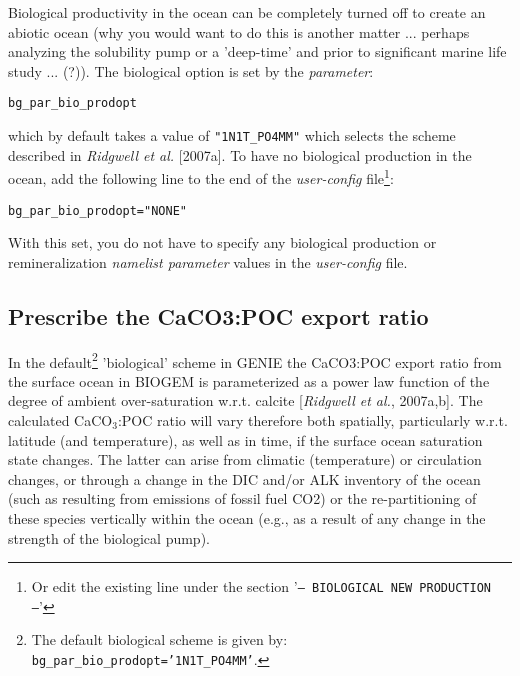 \documentclass[11pt,fleqn]{book} %
\begin{document}
Biological productivity in the ocean can be completely turned off to create an abiotic ocean (why you would want to do this is another matter ... perhaps analyzing the solubility pump or a 'deep-time' and prior to significant marine life study ... (?)). The biological option is set by the \textit{parameter}:
\vspace{-5mm}\small\begin{verbatim}
bg_par_bio_prodopt
\end{verbatim}\vspace{-1mm}\normalsize
 which by default takes a value of \texttt{"1N1T\_PO4MM"} which selects the scheme described in \textit{Ridgwell et al.} [2007a]. To have no biological production in the ocean, add the following line to the end of the \textit{user-config} file\footnote{Or edit the existing line under the section '\texttt{--- BIOLOGICAL NEW PRODUCTION ---}'}:
\vspace{-2mm}\small\begin{verbatim}
bg_par_bio_prodopt="NONE"
\end{verbatim}\normalsize\vspace{-2mm}
With this set, you do not have to specify any biological production or remineralization \textit{namelist parameter} values in the \textit{user-config} file.

%
\newpage
\subsection*{Prescribe the CaCO3:POC export ratio}
\vspace{1mm}

In the default\footnote{The default biological scheme is given by: \texttt{bg\_par\_bio\_prodopt='1N1T\_PO4MM'}.} 'biological' scheme in GENIE the CaCO3:POC export ratio from the surface ocean in BIOGEM is parameterized as a power law function of the degree of ambient over-saturation w.r.t. calcite [\textit{Ridgwell et al.}, 2007a,b]. The calculated CaCO\begin{math}_3\end{math}:POC ratio will vary therefore both spatially, particularly w.r.t. latitude (and temperature), as well as in time, if the surface ocean saturation state changes. The latter can arise from climatic (temperature) or circulation changes, or through a change in the DIC and/or ALK inventory of the ocean (such as resulting from emissions of fossil fuel CO2) or the re-partitioning of these species vertically within the ocean (e.g., as a result of any change in the strength of the biological pump).
\end{document}
